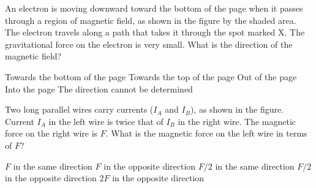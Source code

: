 \documentclass{../../../oss-apphys-exam}
\begin{document}


\raggedcolumns


\begin{questions}
  \question An electron is moving downward toward the bottom of the page when
  it passes through a region of magnetic field, as shown in the figure by
  the shaded area. The electron travels along a path that takes it through
  the spot marked X. The gravitational force on the electron is very
  small. What is the direction of the magnetic field?
  \begin{center}
  \end{center}
  \begin{choices}
    \choice Towards the bottom of the page
    \choice Towards the top of the page
    \choice Out of the page
    \choice Into the page
    \choice The direction cannot be determined
  \end{choices}
  
  \question Two long parallel wires carry currents ($I_A$ and $I_B$), as shown
  in the figure. Current $I_A$ in the left wire is twice that of $I_B$ in the
  right wire. The magnetic force on the right wire is $F$. What is the
  magnetic force on the left wire in terms of $F$?
  \begin{center}
  \end{center}
  \begin{choices}
    \choice $F$ in the same direction
    \choice $F$ in the opposite direction
    \choice $F/2$ in the same direction
    \choice $F/2$ in the opposite direction
    \choice $2F$ in the opposite direction
  \end{choices}
  \newpage
  

\end{questions}
\end{document}
